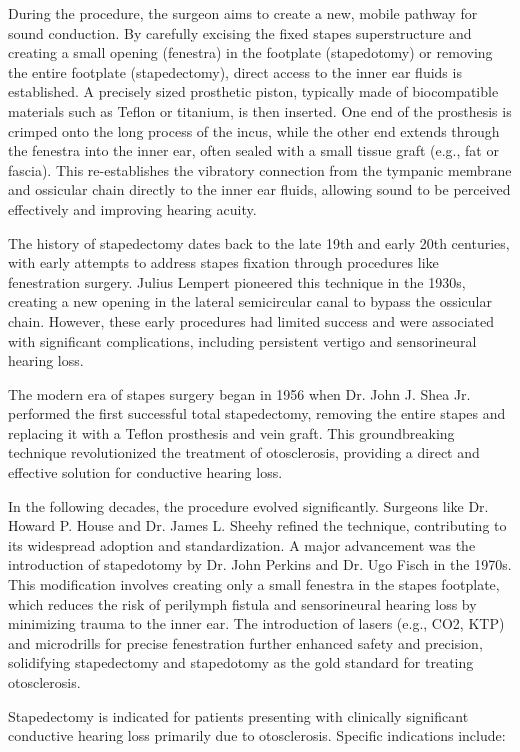 During the procedure, the surgeon aims to create a new, mobile pathway for sound conduction. By carefully excising the fixed stapes superstructure and creating a small opening (fenestra) in the footplate (stapedotomy) or removing the entire footplate (stapedectomy), direct access to the inner ear fluids is established. A precisely sized prosthetic piston, typically made of biocompatible materials such as Teflon or titanium, is then inserted. One end of the prosthesis is crimped onto the long process of the incus, while the other end extends through the fenestra into the inner ear, often sealed with a small tissue graft (e.g., fat or fascia). This re-establishes the vibratory connection from the tympanic membrane and ossicular chain directly to the inner ear fluids, allowing sound to be perceived effectively and improving hearing acuity.

The history of stapedectomy dates back to the late 19th and early 20th centuries, with early attempts to address stapes fixation through procedures like fenestration surgery. Julius Lempert pioneered this technique in the 1930s, creating a new opening in the lateral semicircular canal to bypass the ossicular chain. However, these early procedures had limited success and were associated with significant complications, including persistent vertigo and sensorineural hearing loss.

The modern era of stapes surgery began in 1956 when Dr. John J. Shea Jr. performed the first successful total stapedectomy, removing the entire stapes and replacing it with a Teflon prosthesis and vein graft. This groundbreaking technique revolutionized the treatment of otosclerosis, providing a direct and effective solution for conductive hearing loss.

In the following decades, the procedure evolved significantly. Surgeons like Dr. Howard P. House and Dr. James L. Sheehy refined the technique, contributing to its widespread adoption and standardization. A major advancement was the introduction of stapedotomy by Dr. John Perkins and Dr. Ugo Fisch in the 1970s. This modification involves creating only a small fenestra in the stapes footplate, which reduces the risk of perilymph fistula and sensorineural hearing loss by minimizing trauma to the inner ear. The introduction of lasers (e.g., CO2, KTP) and microdrills for precise fenestration further enhanced safety and precision, solidifying stapedectomy and stapedotomy as the gold standard for treating otosclerosis.

Stapedectomy is indicated for patients presenting with clinically significant conductive hearing loss primarily due to otosclerosis. Specific indications include:

